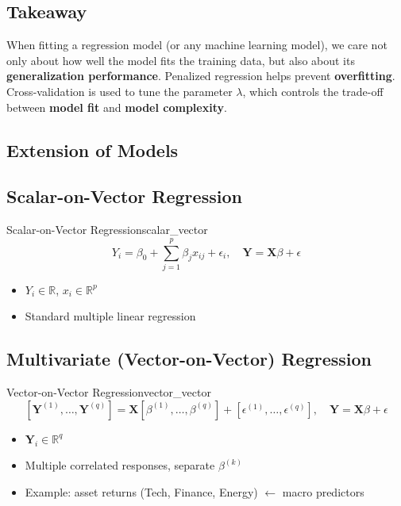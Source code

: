 \subsection{Takeaway}

\begin{caution}
When fitting a regression model (or any machine learning model), we care not only about how well the model fits the training data, but also about its \textbf{generalization performance}. Penalized regression helps prevent \textbf{overfitting}. Cross-validation is used to tune the parameter $\lambda$, which controls the trade-off between \textbf{model fit} and \textbf{model complexity}.
\end{caution}

\subsection{Extension of Models}

\subsection{Scalar-on-Vector Regression}

\begin{defn}{Scalar-on-Vector Regression}{scalar_vector}
\[
Y_i = \beta_0 + \sum_{j=1}^{p} \beta_j x_{ij} + \epsilon_i, \quad \mathbf{Y} = \mathbf{X}\beta + \epsilon
\]

\begin{itemize}
\item $Y_i \in \mathbb{R}$, $x_i \in \mathbb{R}^p$
\item Standard multiple linear regression
\end{itemize}
\end{defn}

\subsection{Multivariate (Vector-on-Vector) Regression}

\begin{defn}{Vector-on-Vector Regression}{vector_vector}
\[
[\mathbf{Y}^{(1)},\dots,\mathbf{Y}^{(q)}] = \mathbf{X}[\beta^{(1)},\dots,\beta^{(q)}] + [\epsilon^{(1)},\dots,\epsilon^{(q)}], \quad \mathbf{Y}=\mathbf{X}\beta+\epsilon
\]

\begin{itemize}
\item $\mathbf{Y}_i \in \mathbb{R}^q$
\item Multiple correlated responses, separate $\beta^{(k)}$
\item Example: asset returns (Tech, Finance, Energy) $\leftarrow$ macro predictors
\end{itemize}
\end{defn}

